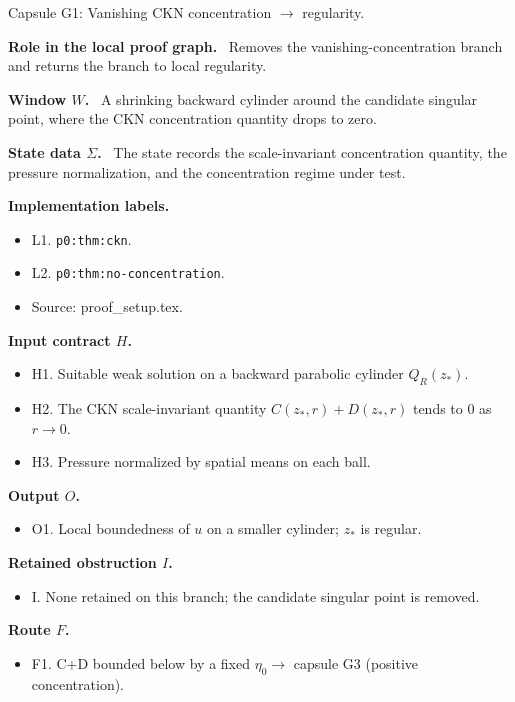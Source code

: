 \documentclass[11pt]{amsart}
\newcommand{\capsulefield}[1]{\par\smallskip\noindent\textbf{#1.}\ }
\begin{document}
\begin{proofcapsule}{Capsule G1: Vanishing CKN concentration $\to$ regularity.}
  \capsulefield{Role in the local proof graph}
  Removes the vanishing-concentration branch and returns the branch to local regularity.

  \capsulefield{Window \(W\)}
A shrinking backward cylinder around the candidate singular point, where the CKN concentration quantity drops to zero.

  \capsulefield{State data \(\Sigma\)}
The state records the scale-invariant concentration quantity, the pressure normalization, and the concentration regime under test.

  \capsulefield{Implementation labels}
  \begin{itemize}[leftmargin=1.8em]
  \item L1. \texttt{p0:thm:ckn}.
  \item L2. \texttt{p0:thm:no-concentration}.
  \item Source: proof\_setup.tex.
  \end{itemize}

  \capsulefield{Input contract \(H\)}
  \begin{itemize}[leftmargin=1.8em]
  \item H1. Suitable weak solution on a backward parabolic cylinder $Q_R(z_*)$.
  \item H2. The CKN scale-invariant quantity $C(z_*,r)+D(z_*,r)$ tends to 0 as \(r\to0\).
  \item H3. Pressure normalized by spatial means on each ball.
  \end{itemize}

  \capsulefield{Output \(O\)}
  \begin{itemize}[leftmargin=1.8em]
  \item O1. Local boundedness of \(u\) on a smaller cylinder; \(z_*\) is regular.
  \end{itemize}

  \capsulefield{Retained obstruction \(I\)}
  \begin{itemize}[leftmargin=1.8em]
  \item I. None retained on this branch; the candidate singular point is removed.
  \end{itemize}

  \capsulefield{Route \(F\)}
  \begin{itemize}[leftmargin=1.8em]
  \item F1. C+D bounded below by a fixed $\eta_0 \to$ capsule G3 (positive concentration).
  \end{itemize}


\end{proofcapsule}
\end{document}
